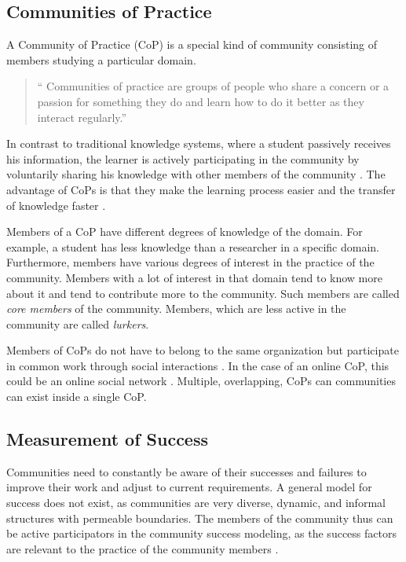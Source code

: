 \subsection{Communities of Practice}\label{sec:CoP}
A Community of Practice (CoP) is a special kind of community consisting of members studying a particular domain.
\begin{quote}
    ``
    Communities of practice are groups of people who share a concern or a passion for something they do and learn how to do it better as they interact regularly.''  \cite{Weng98}
\end{quote}
In contrast to traditional knowledge systems, where a student passively receives his information, the learner is actively participating in the community by voluntarily sharing his knowledge with other members of the community \cite{AMMi15,Kern08}.
The advantage of CoPs is that they make the learning process easier \cite{SaAr05} and the transfer of knowledge faster \cite{CuZe05}.

Members of a CoP have different degrees of knowledge of the domain.
For example, a student has less knowledge than a researcher in a specific domain.
Furthermore, members have various degrees of interest in the practice of the community.
Members with a lot of interest in that domain tend to know more about it and tend to contribute more to the community.
Such members are called \emph{core members} of the community.
Members, which are less active in the community are called \emph{lurkers}.

Members of CoPs do not have to belong to the same organization but participate in common work through social interactions \cite{Weng98}. In the case of an online CoP, this could be an online social network \cite{CuZe05}. Multiple, overlapping, CoPs can communities can exist inside a single CoP.

\subsection{Measurement of Success}
Communities need to constantly be aware of their successes and failures to improve their work and adjust to current requirements.
A general model for success does not exist, as communities are very diverse, dynamic, and informal structures with permeable boundaries.
The members of the community thus can be active participators in the community success modeling, as the success factors are relevant to the practice of the community members \cite{RKJa15}.

